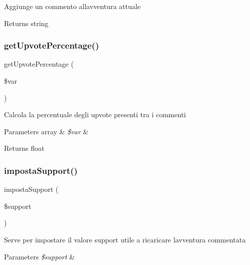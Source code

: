 Aggiunge un commento all\textquotesingle{}avventura attuale

\begin{DoxyReturn}{Returns}
string 
\end{DoxyReturn}
\mbox{\label{class_c_ricerca_a10b8a67c58f8c91b47c1ece8959754be}} 
\subsubsection{\texorpdfstring{get\+Upvote\+Percentage()}{getUpvotePercentage()}}
{\footnotesize\ttfamily get\+Upvote\+Percentage (\begin{DoxyParamCaption}\item[{}]{\$var }\end{DoxyParamCaption})}

Calcola la percentuale degli upvote presenti tra i commenti


\begin{DoxyParams}[1]{Parameters}
array & {\em \$var} & \\
\hline
\end{DoxyParams}
\begin{DoxyReturn}{Returns}
float 
\end{DoxyReturn}
\mbox{\label{class_c_ricerca_a47bd6f2007e7b0b5958bbb079e32cc22}} 
\subsubsection{\texorpdfstring{imposta\+Support()}{impostaSupport()}}
{\footnotesize\ttfamily imposta\+Support (\begin{DoxyParamCaption}\item[{}]{\$support }\end{DoxyParamCaption})}

Serve per impostare il valore support utile a ricaricare l\textquotesingle{}avventura commentata


\begin{DoxyParams}{Parameters}
{\em \$support} & \\
\hline
\end{DoxyParams}
\mbox{\label{class_c_ricerca_ae049a865cd77c4182dd44281b313b545}} 

